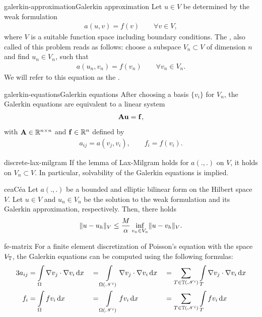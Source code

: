 \begin{Definition*}{galerkin-approximation}{Galerkin approximation}
  Let $u\in V$ be determined by the weak formulation
  \begin{gather*}
    a(u,v) = f(v) \qquad\forall v\in V,
  \end{gather*}
  where $V$ is a suitable function space including boundary
  conditions. The , also called
   of this problem reads as follows:
  choose a subspace $V_n\subset V$ of dimension $n$ and find
  $u_n\in V_n$, such that
  \begin{gather*}
    a(u_n,v_n) = f(v_n) \qquad\forall v_n\in V_n.
  \end{gather*}
  We will refer to this equation as the .
\end{Definition*}

\begin{Corollary*}{galerkin-equations}{Galerkin equations}
  After choosing a basis $\{v_i\}$ for $V_n$, the Galerkin equations are
  equivalent to a linear system
  \begin{gather}
    \mathbf A \mathbf u = \mathbf f,
  \end{gather}
  with $\mathbf A\in\mathbb R^{n\times n}$ and $\mathbf f\in \mathbb R^n$ defined by
  \begin{gather}
    a_{ij} = a(v_j, v_i), \qquad f_i = f(v_i).
  \end{gather}
\end{Corollary*}

\begin{Lemma}{discrete-lax-milgram}
  If the lemma of Lax-Milgram holds for $a(.,.)$ on $V$, it holds on
  $V_n\subset V$. In particular, solvability of the Galerkin equations
  is implied.
\end{Lemma}

\begin{Lemma*}{cea}{Céa}
  Let $a(.,.)$ be a bounded and elliptic bilinear form on the Hilbert
  space $V$. Let $u \in V$ and $u_n\in V_n$ be the solution to the
  weak formulation and its Galerkin approximation, respectively. Then,
  there holds
  \begin{gather}
    \lVert u-u_h\rVert_V \le \frac{M}{\alpha}
    \inf_{v_n\in V_n}\lVert u-v_h\rVert_V.
  \end{gather}
\end{Lemma*}

\begin{Lemma}{fe-matrix}
  For a finite element discretization of Poisson's equation with the
  space $V_\mathbb T$, the Galerkin equations can be computed using the
  following formulas:
  \begin{alignat*}3
    a_{ij} &= \int\limits_\domain \nabla v_j \cdot \nabla v_i \dx
    &&= \int\limits_{\domain(\nodal^i)} \nabla v_j \cdot \nabla v_i \dx
    &&= \sum_{\cell\in\mesh(\nodal^i)}\int\limits_\cell \nabla v_j \cdot \nabla v_i \dx\\
    f_{i} &= \int\limits_\domain f v_i \dx
    &&= \int\limits_{\domain(\nodal^i)} f v_i \dx
    &&= \sum_{\cell\in\mesh(\nodal^i)}\int\limits_\cell f v_i \dx
  \end{alignat*}
\end{Lemma}


